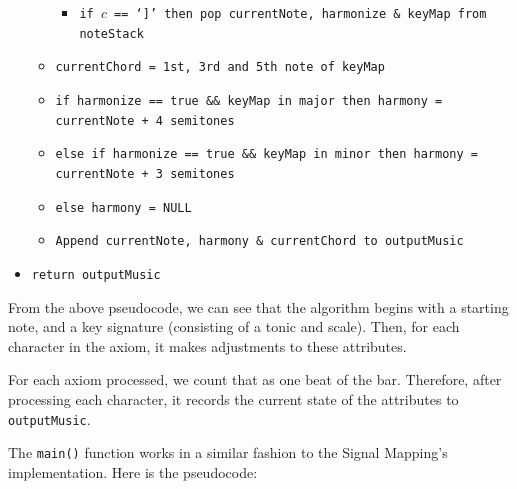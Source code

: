 \begin{singlespace}
\begin{formality}
\begin{itemize}
\begin{itemize}
\begin{itemize}
			\item[\textbullet] \texttt{if $c$ == `]' then pop currentNote, harmonize \& keyMap from noteStack}
		\end{itemize}
		\item[\textbullet] \texttt{currentChord = 1st, 3rd and 5th note of keyMap}
		\item[\textbullet] \texttt{if harmonize == true \&\& keyMap in major then harmony = currentNote + 4 semitones}
		\item[\textbullet] \texttt{else if harmonize == true \&\& keyMap in minor then harmony = currentNote + 3 semitones}
		\item[\textbullet] \texttt{else harmony = NULL}
		\item[\textbullet] \texttt{Append currentNote, harmony \& currentChord to outputMusic}
	\end{itemize}
	\item[\textbullet] \texttt{return outputMusic}
\end{itemize}
\end{formality}
\end{singlespace}

From the above pseudocode, we can see that the algorithm begins with a starting note, and a key signature (consisting of a tonic and scale). Then, for each character in the axiom, it makes adjustments to these attributes.

For each axiom processed, we count that as one beat of the bar. Therefore, after processing each character, it records the current state of the attributes to \texttt{outputMusic}.

The \texttt{main()} function works in a similar fashion to the Signal Mapping's implementation. Here is the pseudocode:

